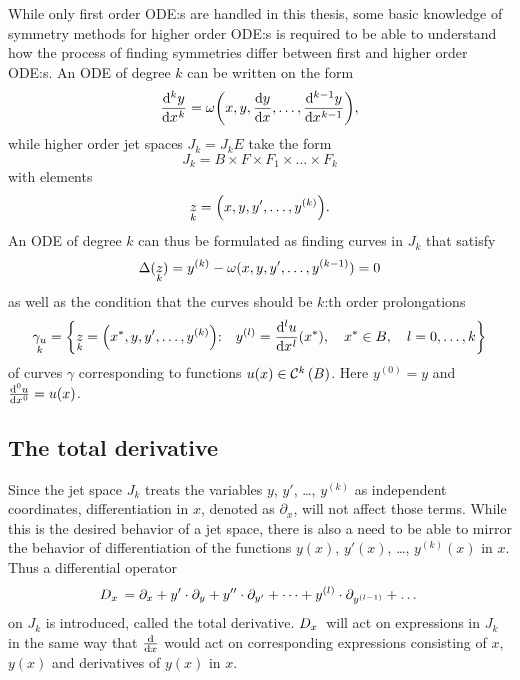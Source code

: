 While only first order ODE:s are handled in this thesis, some basic knowledge of symmetry methods for higher order ODE:s is required to be able to understand how the process of finding symmetries differ between first and higher order ODE:s.
An ODE of degree \(k\) can be written on the form
\begin{equation}
  \diff[k]{y}{x} = \omega\qty(x, y, \diff{y}{x}, \dots, \diff[k-1]{y}{x}),
\end{equation}
while higher order jet spaces \(J_k = J_k E\) take the form
\begin{equation}
  J_k = B \times F \times F_1 \times \dots \times F_k
\end{equation}
with elements
\begin{equation}
  \prolong{z}{k} = \qty(x, y, y', \dots, y^{(k)}).
\end{equation}
An ODE of degree \(k\) can thus be formulated as finding curves in \(J_k\) that satisfy
\begin{equation}
  \Delta(\prolong{z}{k}) = y^{(k)} - \omega(x, y, y', \dots, y^{(k-1)}) = 0
\end{equation}
as well as the condition that the curves should be \(k\):th order prolongations
\begin{equation}
  \prolong{\gamma_u}{k} = \qty{\prolong{z}{k} = \qty(\fixed{x}, y, y', \dots, y^{(k)})\qq*{:} y^{(l)} = \diff[l]{u}{x}{(\fixed{x})}\qc \fixed{x} \in B\qc l = 0, \dots, k}
\end{equation}
of curves \(\gamma\) corresponding to functions \(u(x) \in \cont{k}{B}\).
Here \(y^{(0)} = y\) and \(\diff[0]{u}{x} = u(x)\).

\subsection{The total derivative}

Since the jet space \(J_k\) treats the variables \(y\), \(y'\), \dots, \(y^{(k)}\) as independent coordinates, differentiation in \(x\), denoted as \(\partial_x\), will not affect those terms.
While this is the desired behavior of a jet space, there is also a need to be able to mirror the behavior of differentiation of the functions \(y(x)\), \(y'(x)\), \dots, \(y^{(k)}(x)\) in \(x\).
Thus a differential operator
\begin{equation}
  \tD{x} = \partial_x + y' \cdot \partial_y + y'' \cdot \partial_{y'} + \dots + y^{(l)} \cdot \partial_{y^{(l-1)}} + \dots
\end{equation}
on \(J_k\) is introduced, called the total derivative.
\(\tD{x}\) will act on expressions in \(J_k\) in the same way that \(\diff*{}{x}\) would act on corresponding expressions consisting of \(x\), \(y(x)\) and derivatives of \(y(x)\) in \(x\).

